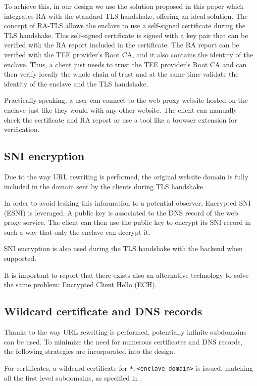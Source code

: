 To achieve this, in our design we use the solution proposed in this paper \cite{sgx-ra-tls-white-paper} which integrates RA with the standard TLS handshake, offering an ideal solution. The concept of RA-TLS allows the enclave to use a self-signed certificate during the TLS handshake. This self-signed certificate is signed with a key pair that can be verified with the RA report included in the certificate. The RA report can be verified with the TEE provider's Root CA, and it also contains the identity of the enclave. Thus, a client just needs to trust the TEE provider's  Root CA and can then verify locally the whole chain of trust and at the same time validate the identity of the enclave and the TLS handshake.

Practically speaking, a user can connect to the web proxy website hosted on the enclave just like they would with any other website. The client can manually check the certificate and RA report or use a tool like a browser extension for verification.

\subsection{SNI encryption} \label{sec:sni-encryption}
Due to the way URL rewriting is performed, the original website domain is fully included in the domain sent by the clients during TLS handshake.

In order to avoid leaking this information to a potential observer, Encrypted SNI (ESNI)\cite{esni} is leveraged. A public key is associated to the DNS record of the web proxy service. The client can then use the public key to encrypt its SNI record in such a way that only the enclave can decrypt it.

SNI encryption is also used during the TLS handshake with the backend when supported.

It is important to report that there exists also an alternative technology to solve the same problem: Encrypted Client Hello (ECH)\cite{ech}.

\subsection{Wildcard certificate and DNS records}
Thanks to the way URL rewriting is performed, potentially infinite subdomains can be used. To minimize the need for numerous certificates and DNS records, the following strategies are incorporated into the design.

For certificates, a wildcard certificate for \texttt{*.<enclave\_domain>} is issued, matching all the first level subdomains, as specified in \cite{rfc9525}.

